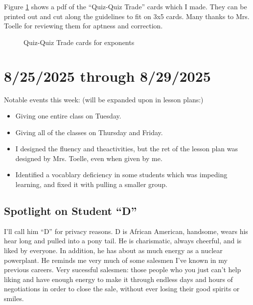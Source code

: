 \documentclass[11pt]{elegantbook}
\begin{document}
Figure \ref{qqt_ex} shows a pdf of the ``Quiz-Quiz Trade'' cards which I made.
They can be printed out and cut along the guidelines to fit on 3x5
cards.  Many thanks to Mrs. Toelle for reviewing them for aptness and
correction.

\pagebreak
\begin{figure}[h]
  \begin{minipage}[t]{5in}
    
    \caption{Quiz-Quiz Trade cards for exponents}
  \end{minipage}
  \label{qqt_ex}
\end{figure}
  







\chapter{8/25/2025 through 8/29/2025}

Notable events this week: (will be expanded upon in lesson plans:)

\begin{itemize}
  
\item Giving one entire class on Tuesday.
  
\item Giving all of the classes on Thursday and Friday.
  
\item I designed the fluency and theactivities, but the ret of the
  lesson plan was designed by Mrs. Toelle, even when given by me.
  
\item Identified a vocablary deficiency in some students which was
  impeding learning, and fixed it with pulling a smaller group.
  
\end{itemize}

\section{Spotlight on Student ``D''}

I'll call him ``D'' for privacy reasons.  D is African American,
handsome, wears his hear long and pulled into a pony tail.  He is
charismatic, always cheerful, and is liked by everyone.  In addition,
he has about as much energy as a nuclear powerplant.  He reminds me
very much of some salesmen I've known in my previous careers.  Very
sucessful salesmen: those people who you just can't help liking and
have enough energy to make it through endless days and hours of
negotiations in order to close the sale, without ever losing their
good spirits or smiles.
\end{document}
